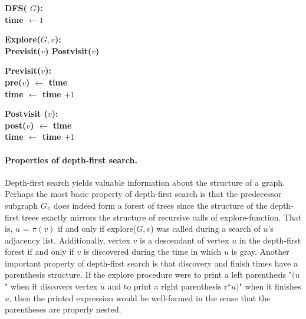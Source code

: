   \begin{algorithm}[H]
   \bf{DFS}( $G$): \\
    time $ \leftarrow 1 $\\

  \end{algorithm}

  \begin{algorithm}[H]
    \bf{Explore}($G,v$): \\
     Previsit($v$)
    Postvisit($v$)
  \end{algorithm}
  \begin{algorithm}[H]
    \bf{Previsit}($v$): \\
    pre($v$) $\leftarrow $ time \\
    time $\leftarrow$ time $+1$
  \end{algorithm}
 \begin{algorithm}[H]
   \bf{Postvisit} ($v$): \\ 
    post($v$) $\leftarrow $ time \\
    time $\leftarrow$ time $+1$
  \end{algorithm}



\paragraph{Properties of depth-first search.} Depth-first search yields valuable information about the structure of a graph. Perhaps the most basic property of depth-first search is that the predecessor subgraph $G_{\pi}$ does indeed form a forest of trees since the structure of the depth-first trees exactly mirrors the structure of recursive calls of explore-function. That is, $u$ = $\pi\left( v \right)$ if and only if explore($G, v$) was called during a search of $ u$'s adjacency list. Additionally, vertex $v$ is a descendant of vertex $u$ in the depth-first forest if and only if $v$ is discovered during the time in which $u$ is gray.
Another important property of depth-first search is that discovery and finish times have a parenthesis structure. If the explore procedure were to print a left parenthesis "$(u$" when it discovers vertex $u$ and to print a right parenthesis r``$u)$" when it finishes $u$, then the printed expression would be well-formed in the sense that the parentheses are properly nested.


